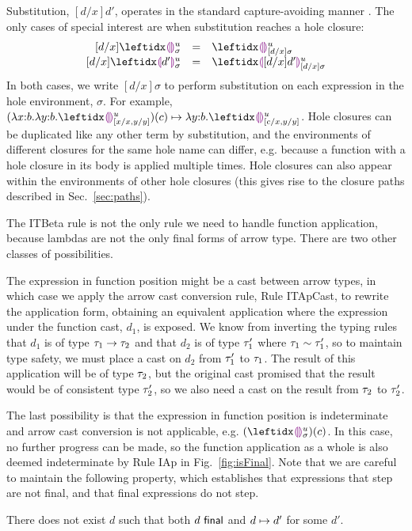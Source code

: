 Substitution, $[d/x]d'$, operates in the standard capture-avoiding manner \cite{pfpl}. The only cases of special interest are when substitution reaches a hole closure:
\[
\begin{array}{rcl}
  [d/x]\dehole{u}{\sigma}{} & = & \dehole{u}{[d/x]\sigma}{} \\%
  \substitute{d}{x}{\dhole{d'}{u}{\sigma}{}} & = & \dhole{[d/x]d'}{u}{[d/x]\sigma}{}
\end{array}
\]
In both cases, we write $[d/x]\sigma$ to perform substitution on each expression in the hole environment, $\sigma$. For example, $\stepsToD{}{\hap{(\halam{x}{b}{\halam{y}{b}{\dehole{u}{[x/x, y/y]}{}}})}{c}}{\halam{y}{b}{\dehole{u}{[c/x, y/y]}{}}}$. Hole closures can be duplicated like any other term by substitution, and the environments of different closures for the same hole name can differ, e.g. because a function with a hole closure in its body is applied multiple times. Hole closures can also appear within the environments of other hole closures (this gives rise to the closure paths described in Sec.~\ref{sec:paths}).%

The ITBeta rule is not the only rule we need to handle function application, because lambdas are not the only final forms of arrow type. There are two other classes of possibilities. 

The expression in function position might be a cast between arrow types, in which case we apply the arrow cast conversion rule, Rule {ITApCast}, to rewrite the application form, obtaining an equivalent application where the expression under the function cast, $d_1$, is exposed. We know from inverting the typing rules that $d_1$ is of type $\tau_1 \rightarrow \tau_2$ and that $d_2$ is of type $\tau_1'$ where $\tau_1 \sim \tau_1'$, so to maintain type safety, we must place a cast on $d_2$ from  $\tau_1'$ to $\tau_1$. The result of this application will be of type $\tau_2$, but the original cast promised that the result would be of consistent type $\tau_2'$, so we also need a cast on the result from $\tau_2$ to $\tau_2'$.

The last possibility is that the expression in function position is indeterminate and arrow cast conversion is not applicable, e.g. $\hap{(\dehole{u}{\sigma}{})}{c}$. In this case, no further progress can be made, so the function application as a whole is also deemed indeterminate by Rule {IAp} in Fig.~\ref{fig:isFinal}. Note that we are careful to maintain the following property, which establishes that expressions that step are not final, and that final expressions do not step.
\begin{thm}[Finality] There does not exist $d$ such that both $d~\mathsf{final}$ and $d \mapsto d'$ for some $d'$.
\end{thm}

